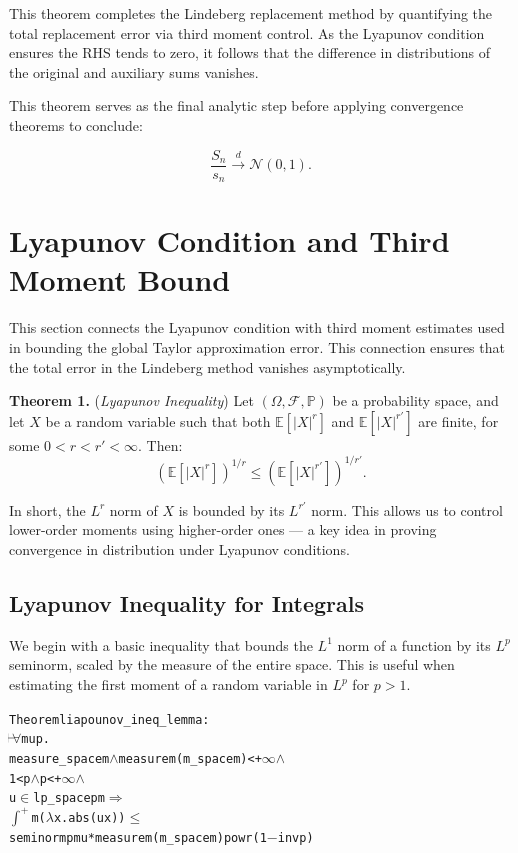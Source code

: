 This theorem completes the Lindeberg replacement method by quantifying the total replacement error via third moment control. As the Lyapunov condition ensures the RHS tends to zero, it follows that the difference in distributions of the original and auxiliary sums vanishes.

This theorem serves as the final analytic step before applying convergence theorems to conclude:

\[
\frac{S_n}{s_n} \xrightarrow{d} \mathcal{N}(0,1).
\]



\section{Lyapunov Condition and Third Moment Bound}

This section connects the Lyapunov condition with third moment estimates used in bounding the global Taylor approximation error. This connection ensures that the total error in the Lindeberg method vanishes asymptotically.

\textbf{Theorem 1.} (\emph{Lyapunov Inequality})
Let $(\Omega, \mathcal{F}, \mathbb{P})$ be a probability space, and let $X$ be a random variable such that both $\mathbb{E}[|X|^r]$ and $\mathbb{E}[|X|^{r'}]$ are finite, for some $0 < r < r' < \infty$. Then:
\[
\left( \mathbb{E}[|X|^r] \right)^{1/r} \le \left( \mathbb{E}[|X|^{r'}] \right)^{1/r'}.
\]

In short, the $L^r$ norm of $X$ is bounded by its $L^{r'}$ norm. This allows us to control lower-order moments using higher-order ones — a key idea in proving convergence in distribution under Lyapunov conditions.


\subsection{Lyapunov Inequality for Integrals}

We begin with a basic inequality that bounds the $L^1$ norm of a function by its $L^p$ seminorm, scaled by the measure of the entire space. This is useful when estimating the first moment of a random variable in $L^p$ for $p > 1$.

\begin{hol}
\begin{alltt}
Theorem liapounov\_ineq\_lemma :
\(\!\!\!{\turn}\!\!\!\!\) \(\forall\)m u p.
measure\_space m \(\land\) measure m (m\_space m) < +\(\infty\) \(\land\)
1 < p \(\land\) p < +\(\infty\) \(\land\)
u \(\in\) lp\_space p m \(\Rightarrow\)
\(\int^+\) m (\(\lambda\)x. abs (u x)) \(\le\)
seminorm p m u * measure m (m\_space m) powr (1 \({-}\) inv p)
\end{alltt}
\end{hol}

